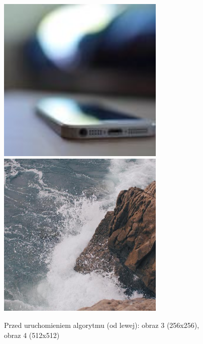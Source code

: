 \documentclass[a4paper,12pt]{book}
\begin{document}
\begin{figure}[H]
	\caption{Przed uruchomieniem algorytmu (od lewej): obraz 3 (256x256), obraz 4 (512x512)}
	\includegraphics[width=8cm, height=8cm]{phone-unmodified.jpg}
	\includegraphics[width=8cm, height=8cm]{sea-unmodified.jpg}
\end{figure}
\end{document}
